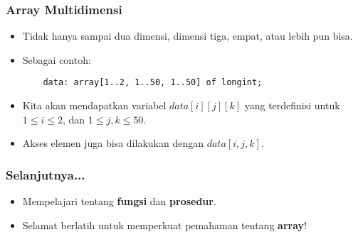 \begin{frame}[fragile]
\frametitle{Array Multidimensi}
\begin{itemize}
  \item Tidak hanya sampai dua dimensi, dimensi tiga, empat, atau lebih pun bisa.
  \item Sebagai contoh:
  \begin{lstlisting}
    data: array[1..2, 1..50, 1..50] of longint;
  \end{lstlisting}
  \item Kita akan mendapatkan variabel $data[i][j][k]$ yang terdefinisi untuk $1 \le i \le 2$, dan $1 \le j, k \le 50$.
  \item Akses elemen juga bisa dilakukan dengan $data[i,j,k]$.
\end{itemize}
\end{frame}

\begin{frame}
\frametitle{Selanjutnya...}
\begin{itemize}
  \item Mempelajari tentang \textbf{fungsi} dan \textbf{prosedur}.
  \item Selamat berlatih untuk memperkuat pemahaman tentang \textbf{array}!
\end{itemize}
\end{frame}


